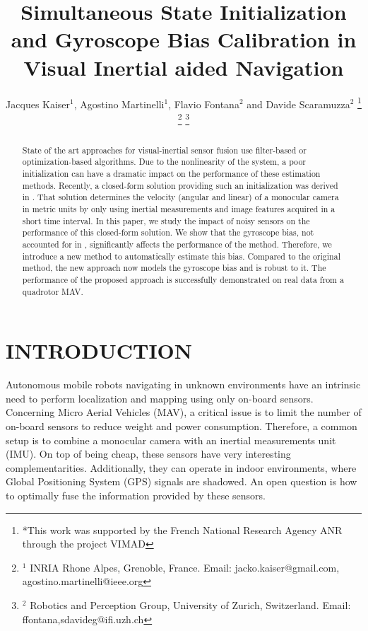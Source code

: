 \documentclass[letterpaper, 10 pt, conference]{ieeeconf}  %
\title{\LARGE \bf
Simultaneous State Initialization and Gyroscope Bias Calibration in Visual Inertial aided Navigation
}
\author{Jacques Kaiser$^{1}$, Agostino Martinelli$^{1}$, Flavio Fontana$^{2}$ and Davide Scaramuzza$^{2}$%
 \thanks{*This work was supported by the French National Research
Agency ANR through the project VIMAD}%
 \thanks{$^{1}$ INRIA Rhone Alpes, Grenoble, France. Email: jacko.kaiser@gmail.com, agostino.martinelli@ieee.org}%
 \thanks{$^{2}$ Robotics and Perception Group, University of Zurich, Switzerland. Email: ffontana,sdavideg@ifi.uzh.ch}%
}
\begin{document}
\maketitle
\thispagestyle{empty}
\pagestyle{empty}



\begin{abstract}
State of the art approaches for visual-inertial sensor fusion use filter-based or optimization-based algorithms. Due to the nonlinearity of the system, a poor initialization can have a dramatic impact on the performance of these estimation methods.
Recently, a closed-form solution providing such an initialization was derived in \cite{Martinelli2014}.
That solution determines the velocity (angular and linear) of a monocular camera in metric units by only using inertial measurements and image features acquired in a short time interval.
In this paper, we study the impact of noisy sensors on the performance of this closed-form solution. We show that the gyroscope bias, not accounted for in \cite{Martinelli2014}, significantly affects the performance of the method.
Therefore, we introduce a new method to automatically estimate this bias.
Compared to the original method, the new approach now models the gyroscope bias and is robust to it.
The performance of the proposed approach is successfully demonstrated on real data from a quadrotor MAV.
\end{abstract}



\section{INTRODUCTION}




Autonomous mobile robots navigating in unknown environments have an intrinsic need to perform localization and mapping using only on-board sensors.
Concerning Micro Aerial Vehicles (MAV), a critical issue is to limit the number of on-board sensors to reduce weight and power consumption.
Therefore, a common setup is to combine a monocular camera with an inertial measurements unit (IMU).
On top of being cheap, these sensors have very interesting complementarities.
Additionally, they can operate in indoor environments, where Global Positioning System (GPS) signals are shadowed.
An open question is how to optimally fuse the information provided by these sensors.
\end{document}
